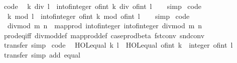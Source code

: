 \begin{isabellebody}
%
\endisadelimproof
\isanewline
{}\isamarkupfalse%
\ {\isacharbrackleft}code{\isacharbrackright}{\isacharcolon}\isanewline
\ \ {\isachardoublequoteopen}k\ div\ l\ {\isacharequal}\ int{\isacharunderscore}of{\isacharunderscore}integer\ {\isacharparenleft}of{\isacharunderscore}int\ k\ div\ of{\isacharunderscore}int\ l{\isacharparenright}{\isachardoublequoteclose}\isanewline
%
\isadelimproof
\ \ %
\endisadelimproof
%
\isatagproof
{}\isamarkupfalse%
\ simp%
\endisatagproof
{\isafoldproof}%
%
\isadelimproof
\isanewline
%
\endisadelimproof
\isanewline
{}\isamarkupfalse%
\ {\isacharbrackleft}code{\isacharbrackright}{\isacharcolon}\isanewline
\ \ {\isachardoublequoteopen}k\ mod\ l\ {\isacharequal}\ int{\isacharunderscore}of{\isacharunderscore}integer\ {\isacharparenleft}of{\isacharunderscore}int\ k\ mod\ of{\isacharunderscore}int\ l{\isacharparenright}{\isachardoublequoteclose}\isanewline
%
\isadelimproof
\ \ %
\endisadelimproof
%
\isatagproof
{}\isamarkupfalse%
\ simp%
\endisatagproof
{\isafoldproof}%
%
\isadelimproof
\isanewline
%
\endisadelimproof
\isanewline
{}\isamarkupfalse%
\ {\isacharbrackleft}code{\isacharbrackright}{\isacharcolon}\isanewline
\ \ {\isachardoublequoteopen}divmod\ m\ n\ {\isacharequal}\ map{\isacharunderscore}prod\ int{\isacharunderscore}of{\isacharunderscore}integer\ int{\isacharunderscore}of{\isacharunderscore}integer\ {\isacharparenleft}divmod\ m\ n{\isacharparenright}{\isachardoublequoteclose}\isanewline
%
\isadelimproof
\ \ %
\endisadelimproof
%
\isatagproof
{}\isamarkupfalse%
\ prod{\isacharunderscore}eq{\isacharunderscore}iff\ divmod{\isacharunderscore}def\ map{\isacharunderscore}prod{\isacharunderscore}def\ case{\isacharunderscore}prod{\isacharunderscore}beta\ fst{\isacharunderscore}conv\ snd{\isacharunderscore}conv\isanewline
\ \ \isamarkupfalse%
\ transfer\ simp%
\endisatagproof
{\isafoldproof}%
%
\isadelimproof
\isanewline
%
\endisadelimproof
\isanewline
{}\isamarkupfalse%
\ {\isacharbrackleft}code{\isacharbrackright}{\isacharcolon}\isanewline
\ \ {\isachardoublequoteopen}HOL{\isachardot}equal\ k\ l\ {\isacharequal}\ HOL{\isachardot}equal\ {\isacharparenleft}of{\isacharunderscore}int\ k\ {\isacharcolon}{\isacharcolon}\ integer{\isacharparenright}\ {\isacharparenleft}of{\isacharunderscore}int\ l{\isacharparenright}{\isachardoublequoteclose}\isanewline
%
\isadelimproof
\ \ %
\endisadelimproof
%
\isatagproof
{}\isamarkupfalse%
\ transfer\ {\isacharparenleft}simp\ add{\isacharcolon}\ equal{\isacharparenright}%

\end{isabellebody}
